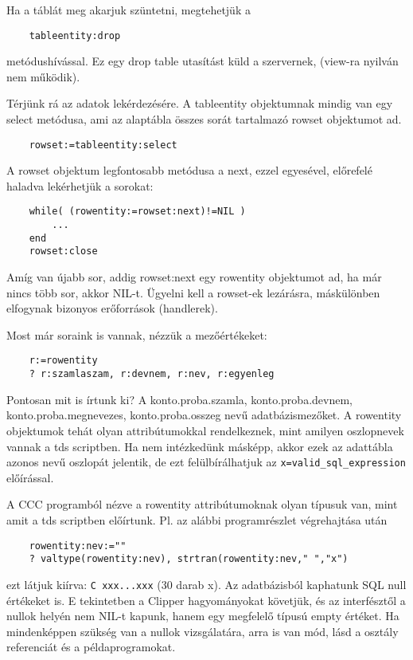 Ha a táblát meg akarjuk szüntetni, megtehetjük a
\begin{verbatim}
    tableentity:drop
\end{verbatim}
metódushívással. Ez egy drop table utasítást küld a szervernek,
(view-ra nyilván nem működik).

Térjünk rá az adatok lekérdezésére. A tableentity objektumnak
mindig van egy select metódusa, ami az alaptábla összes sorát
tartalmazó rowset objektumot ad.
\begin{verbatim}
    rowset:=tableentity:select
\end{verbatim}

A rowset objektum legfontosabb metódusa a next, ezzel egyesével,
előrefelé haladva lekérhetjük a sorokat:
\begin{verbatim}
    while( (rowentity:=rowset:next)!=NIL )
        ...
    end
    rowset:close
\end{verbatim}
Amíg van újabb sor, addig rowset:next egy rowentity objektumot ad,
ha már nincs több sor, akkor NIL-t. Ügyelni kell a rowset-ek lezárásra, 
máskülönben  elfogynak bizonyos erőforrások (handlerek). 

Most már soraink is vannak, nézzük a mezőértékeket:
\begin{verbatim}
    r:=rowentity
    ? r:szamlaszam, r:devnem, r:nev, r:egyenleg
\end{verbatim}
Pontosan mit is írtunk ki? A 
konto.proba.szamla,
konto.proba.devnem,
konto.proba.megnevezes,
konto.proba.osszeg nevű adatbázismezőket.
A rowentity objektumok tehát olyan attribútumokkal rendelkeznek,
mint amilyen oszlopnevek vannak a tds scriptben. Ha nem intézkedünk
másképp, akkor ezek az adattábla azonos nevű oszlopát jelentik,
de ezt felülbírálhatjuk az \verb!x=valid_sql_expression! előírással.

A CCC programból nézve a rowentity attribútumoknak
olyan típusuk van, mint amit a tds scriptben előírtunk. Pl. az alábbi
programrészlet végrehajtása után
\begin{verbatim}
    rowentity:nev:=""
    ? valtype(rowentity:nev), strtran(rowentity:nev," ","x")
\end{verbatim}
ezt látjuk kiírva: \verb!C xxx...xxx! (30 darab x).
Az adatbázisból kaphatunk SQL null értékeket is. E tekintetben
a Clipper hagyományokat követjük, és az interfésztől
a nullok helyén nem NIL-t kapunk, hanem egy megfelelő típusú empty értéket.
Ha mindenképpen szükség van a nullok vizsgálatára, arra is van mód,
lásd a osztály referenciát és a példaprogramokat.



